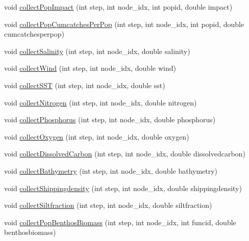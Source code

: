 \begin{DoxyCompactItemize}
void \mbox{\hyperlink{class_displace_model_aa8a30771fb739029da32897b91ffa3cb}{collect\+Pop\+Impact}} (int step, int node\+\_\+idx, int popid, double impact)
\item 
void \mbox{\hyperlink{class_displace_model_a3d07c4e551890205d769c3cab4b76705}{collect\+Pop\+Cumcatches\+Per\+Pop}} (int step, int node\+\_\+idx, int popid, double cumcatchesperpop)
\item 
void \mbox{\hyperlink{class_displace_model_a5a19cbd32d24f58f62f99b862decb818}{collect\+Salinity}} (int step, int node\+\_\+idx, double salinity)
\item 
void \mbox{\hyperlink{class_displace_model_af9f659ec0f9c26a2293a1f860b1e38c9}{collect\+Wind}} (int step, int node\+\_\+idx, double wind)
\item 
void \mbox{\hyperlink{class_displace_model_a92c7598f47226a07dd8e35f48cb2e5a7}{collect\+S\+ST}} (int step, int node\+\_\+idx, double sst)
\item 
void \mbox{\hyperlink{class_displace_model_a915896cb23a66fb862780b682644f7e7}{collect\+Nitrogen}} (int step, int node\+\_\+idx, double nitrogen)
\item 
void \mbox{\hyperlink{class_displace_model_a186f4b09ed2ae8eaf8644d095a6350e8}{collect\+Phosphorus}} (int step, int node\+\_\+idx, double phosphorus)
\item 
void \mbox{\hyperlink{class_displace_model_ab52bd849f9188e7d1452c3b0238d7327}{collect\+Oxygen}} (int step, int node\+\_\+idx, double oxygen)
\item 
void \mbox{\hyperlink{class_displace_model_a33bf82a29c201e87e6991519217e395f}{collect\+Dissolved\+Carbon}} (int step, int node\+\_\+idx, double dissolvedcarbon)
\item 
void \mbox{\hyperlink{class_displace_model_a2f2b03089b3847207318867c0aab14ca}{collect\+Bathymetry}} (int step, int node\+\_\+idx, double bathymetry)
\item 
void \mbox{\hyperlink{class_displace_model_a4f71200aa7a047b3dc90380130ccd855}{collect\+Shippingdensity}} (int step, int node\+\_\+idx, double shippingdensity)
\item 
void \mbox{\hyperlink{class_displace_model_a800fdc8716ca67463f08b47058151d11}{collect\+Siltfraction}} (int step, int node\+\_\+idx, double siltfraction)
\item 
void \mbox{\hyperlink{class_displace_model_a00f5227fe870431d73c91a64ae2f1fe5}{collect\+Pop\+Benthos\+Biomass}} (int step, int node\+\_\+idx, int funcid, double benthosbiomass)
\item 

\end{DoxyCompactItemize}
